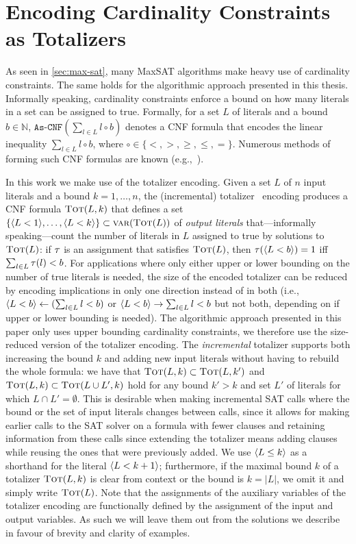 \section{Encoding Cardinality Constraints as Totalizers\label{sec:card-const}}

As seen in \cref{sec:max-sat}, many MaxSAT algorithms make heavy use of cardinality constraints.
The same holds for the algorithmic approach presented in this thesis.
Informally speaking, cardinality constraints enforce a bound on how many literals in a set can be assigned to true.
Formally, for a set $L$ of literals and a bound $b \in \mathbb{N}$, $\texttt{As-CNF}\left(\sum_{l \in L} l \circ b\right)$ denotes a CNF formula that encodes the linear inequality $\sum_{l \in L} l \circ b$, where $\circ \in \{< ,> ,\geq, \leq, =\}$.
Numerous methods of forming such CNF formulas are known (e.g.,~\autocites{DBLP:conf/cp/BailleuxB03,DBLP:conf/cp/Sinz05,DBLP:journals/jsat/EenS06}).

In this work we make use of the totalizer encoding.
Given a set $L$ of $n$ input literals and a bound $k=1, \ldots, n$, the (incremental) totalizer~\autocites{DBLP:conf/cp/BailleuxB03,DBLP:conf/cp/MartinsJML14} encoding produces a CNF formula $\textsc{Tot}(L, k)$ that defines a set $\{\langle L < 1 \rangle, \ldots, \langle L < k \rangle\} \subset \textsc{var}(\textsc{Tot}(L))$ of \emph{output literals} that---informally speaking---count the number of literals in $L$ assigned to true by solutions to $\textsc{Tot}(L)$:
if $\tau$ is an assignment that satisfies $\textsc{Tot}(L)$, then $\tau(\langle L < b \rangle) = 1$ iff $\sum_{l \in L} \tau(l) < b$.
For applications where only either upper or lower bounding on the number of true literals is needed, the size of the encoded totalizer can be reduced by encoding implications in only one direction instead of in both (i.e., $\langle L < b \rangle \leftarrow (\sum_{l \in L} l < b)$ or $\langle L < b \rangle \rightarrow \sum_{l \in L} l < b$ but not both, depending on if upper or lower bounding is needed).
The algorithmic approach presented in this paper only uses upper bounding cardinality constraints, we therefore use the size-reduced version of the totalizer encoding.
The \emph{incremental} totalizer supports both increasing the bound $k$ and adding new input literals without having to rebuild the whole formula:
we have that $\textsc{Tot}(L, k) \subset \textsc{Tot}(L, k')$ and $\textsc{Tot}(L, k) \subset  \textsc{Tot}(L \cup L', k)$ hold for any bound $k' > k$ and set $L'$ of literals for which $L \cap L' =  \emptyset$. 
This is desirable when making incremental SAT calls where the bound or the set of input literals changes between calls, since it allows for making earlier calls to the SAT solver on a formula with fewer clauses and retaining information from these calls since extending the totalizer means adding clauses while reusing the ones that were previously added.
We use $\langle L \leq k \rangle$ as a shorthand for the literal $\langle L < k+1 \rangle$;
furthermore, if the maximal bound $k$ of a totalizer $\textsc{Tot}(L,k)$ is clear from context or the bound is $k=|L|$, we omit it and simply write $\textsc{Tot}(L)$.
Note that the assignments of the auxiliary variables of the totalizer encoding are functionally defined by the assignment of the input and output variables.
As such we will leave them out from the solutions we describe in favour of brevity and clarity of examples. 